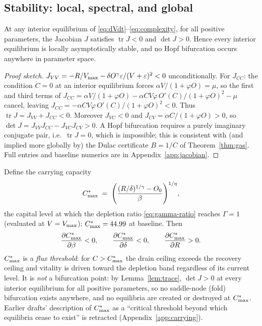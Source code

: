 \subsection{Stability: local, spectral, and global}
\label{sec:stability}

\begin{lemma}
\label{lem:trace}
At any interior equilibrium of \eqref{eq:dVdt}--\eqref{eq:complexity}, for
all positive parameters, the Jacobian $J$ satisfies
$\operatorname{tr}J<0$ and $\det J>0$. Hence every interior equilibrium is
locally asymptotically stable, and no Hopf bifurcation occurs anywhere in
parameter space.
\end{lemma}

\begin{proof}[Proof sketch]
$J_{VV}=-R/V_{\max}-\delta O^{\gamma}\varepsilon/(V+\varepsilon)^{2}<0$
unconditionally. For $J_{CC}$: the condition $\dot C=0$ at an interior
equilibrium forces $\alpha V/(1+\varphi O)=\mu$, so the first and third
terms of
$J_{CC}=\alpha V/(1+\varphi O)
-\alpha CV\varphi\,O'(C)/(1+\varphi O)^{2}-\mu$
cancel, leaving
$J_{CC}=-\alpha C V\varphi\,O'(C)/(1+\varphi O)^{2}<0$.
Thus $\operatorname{tr}J=J_{VV}+J_{CC}<0$. Moreover
$J_{VC}<0$ and $J_{CV}=\alpha C/(1+\varphi O)>0$, so
$\det J=J_{VV}J_{CC}-J_{VC}J_{CV}>0$. A Hopf bifurcation requires a purely
imaginary conjugate pair, i.e.\ $\operatorname{tr}J=0$, which is impossible;
this is consistent with (and implied more globally by) the Dulac certificate
$B=1/C$ of Theorem~\ref{thm:gas}. Full entries and baseline numerics are in
Appendix~\ref{app:jacobian}.
\end{proof}

\begin{proposition}
\label{prop:carrying}
Define the carrying capacity
\begin{equation}
\label{eq:cmax}
C^{*}_{\max} \;=\;
\Biggl(\frac{(R/\delta)^{1/\gamma}-O_0}{\beta}\Biggr)^{1/\eta},
\end{equation}
the capital level at which the depletion ratio \eqref{eq:gamma-ratio}
reaches $\Gamma=1$ (evaluated at $V=V_{\max}$); $C^{*}_{\max}=44.99$ at baseline. Then
\begin{equation}
\label{eq:cmax-statics}
\frac{\partial C^{*}_{\max}}{\partial\beta}<0,\qquad
\frac{\partial C^{*}_{\max}}{\partial\delta}<0,\qquad
\frac{\partial C^{*}_{\max}}{\partial R}>0 .
\end{equation}
$C^{*}_{\max}$ is a \emph{flux threshold}: for $C>C^{*}_{\max}$ the drain ceiling exceeds
the recovery ceiling and vitality is driven toward the depletion band
regardless of its current level. It is \emph{not} a bifurcation point: by
Lemma~\ref{lem:trace}, $\det J>0$ at every interior equilibrium for all
positive parameters, so no saddle-node (fold) bifurcation exists anywhere,
and no equilibria are created or destroyed at $C^{*}_{\max}$. Earlier drafts'
description of $C^{*}_{\max}$ as a ``critical threshold beyond which equilibria
cease to exist'' is retracted (Appendix~\ref{app:carrying}).
\end{proposition}

